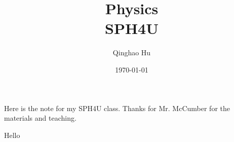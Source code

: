 \documentclass[11pt]{article}
\title{\textbf{Physics} \\ \large SPH4U}
\author{Qinghao Hu}
\date{\today}
\theoremstyle{plain}
\theoremstyle{definition}
\theoremstyle{remark}
\theoremstyle{definition}
\begin{document}
\maketitle


Here is the note for my SPH4U class. 
Thanks for Mr. McCumber for the materials and teaching. 

\newpage
\tableofcontents

Hello 
\end{document}
